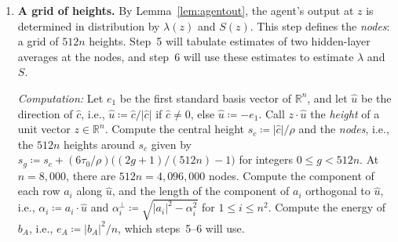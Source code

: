 \documentclass[10pt]{article}
\newenvironment{leanitems}{\par\smallskip\relscale{0.78}\color{gray}\hypersetup{urlcolor=gray}\raggedright%
  \begin{list}{}{\setlength{\leftmargin}{2em}\setlength{\labelwidth}{1.6em}%
  \setlength{\labelsep}{0.4em}\setlength{\itemsep}{0pt}\setlength{\topsep}{0pt}%
  \setlength{\parsep}{0pt}}}{\end{list}\par\medskip}
\newcommand{\RR}{\mathbb{R}}
\newcommand{\Dd}{\mathcal{D}}\newcommand{\Ee}{\mathcal{E}}
\newcommand{\PP}{\mathbb{P}}
\newcommand{\chat}{\hat c}
\begin{document}
\begin{enumerate}[leftmargin=*,itemsep=8pt,topsep=10pt plus 2pt]
\begin{leanitems}
  . Lean proves a joint
  form (\texttt{triple\_disint}): $\Dd$ and the three networks
  have the law obtained by rebuilding $W_3$ and $A_3$ from $\Dd$
  and from Gaussian matrices $G_W$ and $G_A$, independent of each other and of
  $\Dd$, whose entries have variances $\nu_W$ and $\nu_A$,
  respectively; the residual parts are $G_W\Pi_{b_W}$ and $G_A\Pi_{b_A}$. With
  \texttt{mlp2\_reb}, which proves Lemma~\ref{lem:asplit} at every input, and
  \texttt{resid\_gauss}, this gives Lemma~\ref{lem:agentout} at each input.
  \end{leanitems}
  The splitting of $A_3$ in Lemma~\ref{lem:asplit} is the Gaussian
  conditioning trick of \citet{bolthausen-2014}, also used by
  \citet{bayati-montanari-2011} and by \citet{yang-2019-tp1} in Tensor Programs. Let $\tilde p$ be the
  failure probability at the proxy input, i.e.,
  $\tilde p\coloneqq \PP_\xi[F(A(\tilde x))>t]$, a function of $\Dd$ and
  $\Omega_A$.

  \emph{Cost:} $2n^4+20n^3+O(n^2)$ operations, including $2n^3$ for $c_A=A_3b_A$. Almost all of these
  operations compute the product $A_2\hat h$. The cost model in Lean does not
  charge for the weights of $B_n$. Computing these weights as in step~2 would
  take about $3n$ more operations.

\item \textbf{A grid of heights.} By Lemma~\ref{lem:agentout}, the agent's output at $z$ is
  determined in distribution by $\lambda(z)$ and $S(z)$. This step defines the
  \emph{nodes}: a grid of $512n$ heights. Step~5 will tabulate estimates of
  two hidden-layer averages at the nodes, and step~6 will use these estimates to estimate $\lambda$ and
  $S$.

  \emph{Computation:} Let $e_1$ be the first standard basis vector of $\RR^n$,
  and let $\hat u$ be the direction of $\chat$, i.e.,
  $\hat u\coloneqq \chat/|\chat|$ if $\chat\ne0$, else
  $\hat u\coloneqq -e_1$. Call $z\cdot\hat u$ the \emph{height} of a unit
  vector $z\in\RR^n$. Compute the central height $s_c\coloneqq |\chat|/\rho$
  and the \emph{nodes}, i.e., the $512n$ heights around $s_c$ given by
  $s_g\coloneqq s_c+(6\tau_0/\rho)\bigl((2g+1)/(512n)-1\bigr)$ for integers
  $0\le g<512n$. At $n=8{,}000$, there are $512n=4{,}096{,}000$ nodes. Compute the
  component of each row $a_i$ along $\hat u$, and the length of the component of
  $a_i$ orthogonal to $\hat u$, i.e.,
  $\alpha_i\coloneqq a_i\cdot\hat u$ and
  $\alpha^\perp_i\coloneqq \sqrt{|a_i|^2-\alpha_i^2}$ for $1\le i\le n^2$.
  Compute the energy of $b_A$, i.e., $e_A\coloneqq |b_A|^2/n$, which steps~5--6
  will use.


\end{enumerate}
\end{document}

